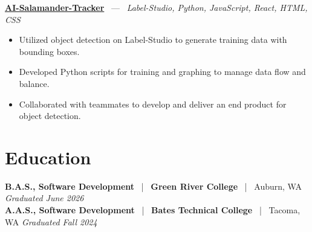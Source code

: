 \documentclass[10pt, letterpaper]{article}
\newcommand{\jobhead}[4]{%
  \vspace{5pt}%
  {\bfseries\color{dark}#1}%
  ~{\color{light}|}~%
  {\bfseries\color{navy}#2}%
  ~{\color{light}|}~%
  {\color{light}#3}%
  \hfill{\color{light}\small\textit{#4}}\\[-2pt]%
}
\newcommand{\projhead}[3]{%
  \vspace{5pt}%
  {\bfseries\color{dark}\href{#2}{#1}}%
  ~{\color{light}---}~%
  {\color{light}\small\textit{#3}}\\[-2pt]%
}
\begin{document}
\projhead{AI-Salamander-Tracker}{https://github.com/xavierb117/Salamander-Tracker-YOLO}{Label-Studio, Python, JavaScript, React, HTML, CSS}
\begin{itemize}
  \item Utilized object detection on Label-Studio to generate training data with bounding boxes.
  \item Developed Python scripts for training and graphing to manage data flow and balance.
  \item Collaborated with teammates to develop and deliver an end product for object detection.
\end{itemize}

\section{Education}

\jobhead{B.A.S., Software Development}{Green River College}{Auburn, WA}{Graduated June 2026}
\jobhead{A.A.S., Software Development}{Bates Technical College}{Tacoma, WA}{Graduated Fall 2024}
\end{document}
